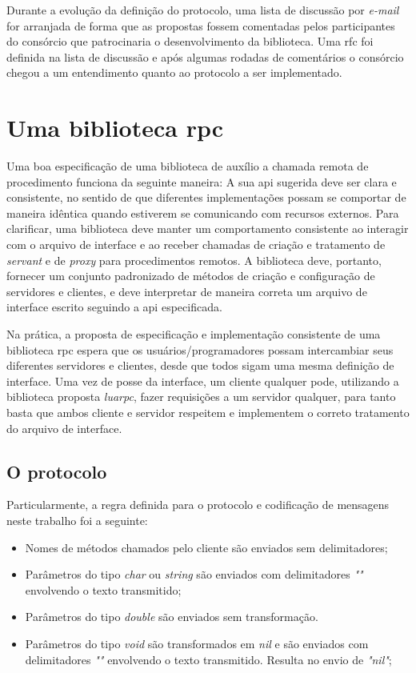 \documentclass[11pt]{article}
\begin{document}
Durante a evolução da definição do protocolo, uma lista de discussão por
\textit{e-mail} for arranjada de forma que as propostas fossem
comentadas pelos participantes do consórcio que patrocinaria o desenvolvimento
da biblioteca. Uma \gls{rfc} foi definida na lista de discussão e após algumas
rodadas de comentários o consórcio chegou a um entendimento quanto
ao protocolo a ser implementado.

\section{Uma biblioteca \gls{rpc}}\label{sec:rpc}

Uma boa especificação de uma biblioteca de auxílio a chamada remota de
procedimento funciona da seguinte maneira: A sua \gls{api} sugerida deve ser
clara e consistente, no sentido de que diferentes implementações possam se
comportar de maneira idêntica quando estiverem se comunicando com recursos
externos. Para clarificar, uma biblioteca deve manter um comportamento
consistente ao interagir com o arquivo de interface e ao receber chamadas de
criação e tratamento de \textit{servant} e de \textit{proxy} para procedimentos remotos.
A biblioteca deve,
portanto, fornecer um conjunto padronizado de métodos de criação e configuração
de servidores e clientes, e deve interpretar de maneira correta um arquivo de
interface escrito seguindo a \gls{api} especificada.

Na prática, a proposta de especificação e implementação consistente de uma
biblioteca \gls{rpc} espera que os usuários/programadores possam intercambiar
seus diferentes servidores e clientes, desde que todos sigam uma mesma definição
de interface. Uma vez de posse da interface, um cliente qualquer pode,
utilizando a biblioteca proposta \textit{luarpc}, fazer requisições a um
servidor qualquer, para tanto basta que ambos cliente e servidor respeitem e
implementem o correto tratamento do arquivo de interface.

\subsection{O protocolo}\label{subsec:proto}

Particularmente, a regra definida para o protocolo e codificação de mensagens
neste trabalho foi a seguinte:

\begin{itemize}
\item
Nomes de métodos chamados pelo cliente são enviados sem delimitadores;
\item
Parâmetros do tipo \textit{char} ou \textit{string} são enviados com delimitadores
\textit{""} envolvendo o texto transmitido;
\item
Parâmetros do tipo \textit{double} são enviados sem transformação.
\item
Parâmetros do tipo \textit{void} são transformados em \textit{nil} e são enviados
com delimitadores \textit{""} envolvendo o texto transmitido. Resulta no envio
de \textit{"nil"};
\end{itemize}
\end{document}
